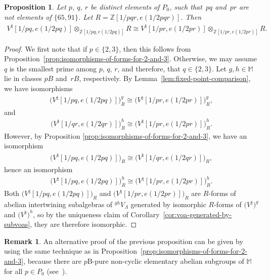 \documentclass[11pt]{article}
\newcommand{\bM}{\mathbb{M}}
\newcommand{\bZ}{\mathbb{Z}}
\newtheorem{prop}[thm]{Proposition}
\theoremstyle{definition}
\newtheorem{rem}[thm]{Remark}
\begin{document}
\begin{prop} \label{prop:full-comparison-of-forms} Let $p$, $q$, $r$ be distinct elements of $P_0$, such that~$pq$ and~$pr$ are not elements of $\{ 65, 91\}$. Let $R = \bZ[1/pqr,e(1/2pqr)]$. Then
\begin{gather*} V^\natural[1/pq, e(1/2pq)] \otimes_{\bZ[1/pq, e(1/2pq)]} R \cong V^\natural[1/pr, e(1/2pr)] \otimes_{\bZ[1/pr, e(1/2pr)]} R. \end{gather*}
\end{prop}
\begin{proof}
We first note that if $p \in \{2,3\}$, then this follows from Proposition~\ref{prop:isomorphisms-of-forms-for-2-and-3}. Otherwise, we may assume $q$ is the smallest prime among $p$, $q$, $r$, and therefore, that $q \in \{2,3\}$. Let $g,h \in \bM$ lie in classes $pB$ and~$rB$, respectively. By Lemma~\ref{lem:fixed-point-comparison}, we have isomorphisms
\begin{gather*} \big(V^\natural[1/pq,e(1/2pq)]\big)^g_R \cong \big(V^\natural[1/pr,e(1/2pr)]\big)^g_R, \end{gather*}
and
\begin{gather*} \big(V^\natural[1/qr,e(1/2qr)]\big)^h_R \cong \big(V^\natural[1/pr,e(1/2pr)]\big)^h_R. \end{gather*}
However, by Proposition \ref{prop:isomorphisms-of-forms-for-2-and-3}, we have an isomorphism
\begin{gather*} \big(V^\natural[1/pq,e(1/2pq)]\big)_R \cong \big(V^\natural[1/qr,e(1/2qr)]\big)_R, \end{gather*}
hence an isomorphism
\begin{gather*} \big(V^\natural[1/pq,e(1/2pq)]\big)^h_R \cong \big(V^\natural[1/pr,e(1/2pr)]\big)^h_R. \end{gather*}
Both $\big(V^\natural[1/pq,e(1/2pq)]\big)_R$ and $\big(V^\natural[1/pr,e(1/2pr)]\big)_R$ are $R$-forms of abelian intertwining subalgebras of ${}^{gh}V_\Lambda$ generated by isomorphic $R$-forms of $\big(V^\natural\big)^g$ and $\big(V^\natural\big)^h$, so by the uniqueness claim of Corollary~\ref{cor:voa-generated-by-subvoas}, they are therefore isomorphic.
\end{proof}

\begin{rem}An alternative proof of the previous proposition can be given by using the same technique as in Proposition~\ref{prop:isomorphisms-of-forms-for-2-and-3}, because there are $p$B-pure non-cyclic elementary abelian subgroups of $\bM$ for all $p \in P_0$ (see~\cite{W88}).
\end{rem}
\end{document}
